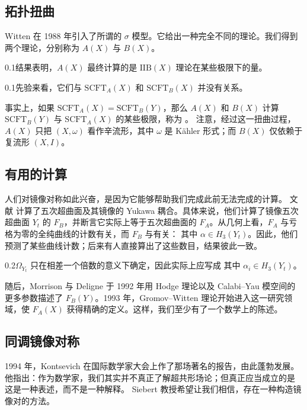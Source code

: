 \subsection{拓扑扭曲}
Witten 在 1988 年引入了所谓的 $\sigma$ 模型。它给出一种完全不同的理论。我们得到两个理论，分别称为 $A(X)$ 与 $B(X)$。
\begin{Warning}{0.1}结果表明，$A(X)$ 最终计算的是 $\mathrm{IIB}(X)$ 理论在某些极限下的量。\end{Warning}
\begin{Note}{0.1}先验来看，它们与 $\mathrm{SCFT}_A(X)$ 和 $\mathrm{SCFT}_B(X)$ 并没有关系。\end{Note}
事实上，如果 $\mathrm{SCFT}_A(X)=\mathrm{SCFT}_B(Y)$，那么
$A(X)$ 和 $B(X)$ 计算 $\mathrm{SCFT}_B(Y)$ 与 $\mathrm{SCFT}_A(X)$ 的某些极限，称为 。
注意，经过这一扭曲过程，$A(X)$ 只把 $(X,\omega)$ 看作辛流形，其中 $\omega$ 是 Kähler 形式；而 $B(X)$ 仅依赖于复流形 $(X,I)$。
\subsection{有用的计算}
人们对镜像对称如此兴奋，是因为它能够帮助我们完成此前无法完成的计算。
文献 \cite{ref4} 计算了五次超曲面及其镜像的 Yukawa 耦合。具体来说，他们计算了镜像五次超曲面 $Y_t$ 的 $F_B$，并断言它实际上等于五次超曲面的 $F_A$。从几何上看，$F_A$ 与亏格为零的全纯曲线的计数有关，而 $F_B$ 与有关：
其中 $\alpha\in H_3(Y_t)$。因此，他们预测了某些曲线计数；后来有人直接算出了这些数目，结果彼此一致。
\begin{Warning}{0.2}$\Omega_{Y_t}$ 只在相差一个倍数的意义下确定，因此实际上应写成
其中 $\alpha_i\in H_3(Y_t)$。
\end{Warning}
随后，Morrison 与 Deligne 于 1992 年用 Hodge 理论以及 Calabi–Yau 模空间的更多参数描述了 $F_B(Y)$。1993 年，Gromov–Witten 理论开始进入这一研究领域，使 $F_A(X)$ 获得精确的定义。这样，我们至少有了一个数学上的陈述。
\subsection{同调镜像对称}
1994 年，Kontsevich 在国际数学家大会上作了那场著名的报告，由此蓬勃发展。他指出：作为数学家，我们其实并不真正了解超共形场论；但真正应当成立的是
这是一种表述，而不是一种解释。
Siebert 教授希望让我们相信，存在一种构造镜像对的方法。
